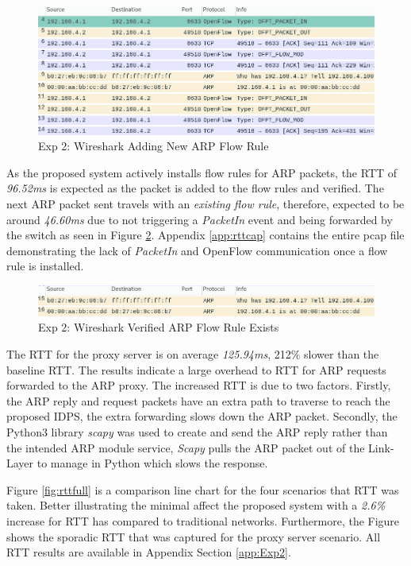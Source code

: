 \documentclass[12pt, oneside]{book}
\begin{document}
\begin{figure}[H]
	\centering
	\includegraphics[scale=0.44]{../tests/RTT/newflowrule.png}
	\caption{Exp 2: Wireshark Adding New ARP Flow Rule}
	\label{fig:wireflow}
\end{figure}

As the proposed system actively installs flow rules for ARP packets,
the RTT of \emph{96.52ms} is expected as the packet is added to the flow rules and verified.
The next ARP packet sent travels with an \emph{existing flow rule}, therefore, expected to be around \emph{46.60ms} due to 
not triggering a \emph{PacketIn} event and being forwarded by the switch as seen in Figure \ref{fig:wireflowDone}.
Appendix \ref{app:rttcap} contains the entire pcap file demonstrating the lack of \emph{PacketIn} and OpenFlow
communication once a flow rule is installed.

\begin{figure}[H]
	\centering
	\includegraphics[scale=0.44]{../tests/RTT/newflowruleDone.png}
	\caption{Exp 2: Wireshark Verified ARP Flow Rule Exists}
	\label{fig:wireflowDone}
\end{figure}

The RTT for the proxy server is on average \emph{125.94ms}, 212\% slower than the baseline RTT. 
The results indicate a large overhead to RTT for ARP requests forwarded to the ARP proxy.
The increased RTT is due to two
factors. Firstly, the ARP reply and request packets have an extra path to traverse to reach the proposed IDPS, the extra forwarding
slows down the ARP packet. Secondly, the 
Python3 library \emph{scapy} was used to create and send the ARP reply rather than the intended ARP module service, \emph{Scapy} pulls
the ARP packet out of the Link-Layer to manage in Python which slows the response.


Figure \ref{fig:rttfull} is a comparison line chart for the four scenarios that RTT was taken. Better illustrating the minimal
affect the proposed system with a \emph{2.6\%} increase for RTT has compared to traditional networks.
Furthermore, the Figure shows the sporadic RTT that was captured for the proxy server scenario.
All RTT results are available in Appendix Section \ref{app:Exp2}.
\end{document}
